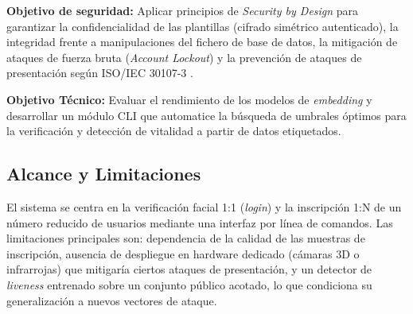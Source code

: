 \textbf{Objetivo de seguridad:} Aplicar principios de \textit{Security by Design} para garantizar la confidencialidad de las plantillas (cifrado simétrico autenticado), la integridad frente a manipulaciones del fichero de base de datos, la mitigación de ataques de fuerza bruta (\textit{Account Lockout}) y la prevención de ataques de presentación según ISO/IEC 30107-3 \cite{iso30107}.

\textbf{Objetivo Técnico:} Evaluar el rendimiento de los modelos de \textit{embedding} y desarrollar un módulo CLI que automatice la búsqueda de umbrales óptimos para la verificación y detección de vitalidad a partir de datos etiquetados.

\subsection{Alcance y Limitaciones}
\label{subsec:alcance}

El sistema se centra en la verificación facial 1:1 (\textit{login}) y la inscripción 1:N de un número reducido de usuarios mediante una interfaz por línea de comandos. Las limitaciones principales son: dependencia de la calidad de las muestras de inscripción, ausencia de despliegue en hardware dedicado (cámaras 3D o infrarrojas) que mitigaría ciertos ataques de presentación, y un detector de \textit{liveness} entrenado sobre un conjunto público acotado, lo que condiciona su generalización a nuevos vectores de ataque.
